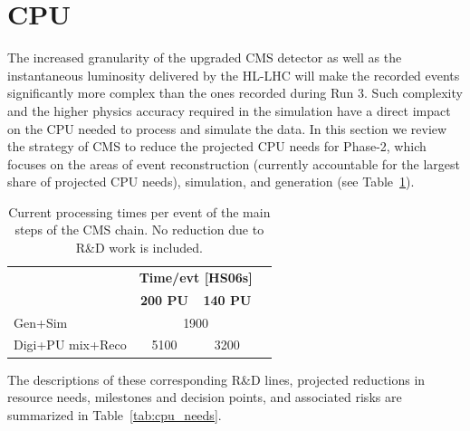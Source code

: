 \documentclass{cmspaper}
\newcommand{\trh}{\cellcolor{tablerowheader}}
\newcommand{\B}[1]{\textbf{#1}}
\newcommand{\UP}[1]{\multirow{-2}{*}{\B{#1}}}
\begin{document}
\section{CPU}
\label{sec:cpu_needs}
The increased granularity of the upgraded CMS detector as well as the instantaneous luminosity delivered by the HL-LHC will make the recorded events significantly more complex than the ones recorded during Run 3. Such complexity and the higher physics accuracy required in the simulation have a direct impact on the CPU needed to process and simulate the data. In this section we review the strategy of CMS to reduce the projected CPU needs for Phase-2, which focuses on the areas of event reconstruction (currently accountable for the largest share of projected CPU needs), simulation, and generation (see Table~\ref{tab:processing_times}).
\begin{table}[ht]
\begin{center}
\caption{Current processing times per event of the main steps of the CMS chain. No reduction due to R\&D work is included.}
\label{tab:processing_times}
\begin{tabular}{lccc} 
\hline
\rowcolor{tableheader}                      & \multicolumn{2}{c}{\B{Time/evt [HS06s]}}\\
\rowcolor{tableheader} \UP{Processing Step} & \B{200 PU} &  \B{140 PU} \\
\hline\hline
\trh Gen+Sim                             & \multicolumn{2}{c}{1900} \\ 
\trh Digi+PU mix+Reco                    & 5100 & 3200 \\ \hline
\end{tabular}
\end{center}
\end{table}

The descriptions of these corresponding R\&D lines, projected reductions in resource needs, milestones and decision points, and associated risks are summarized in Table~\ref{tab:cpu_needs}.
\end{document}
